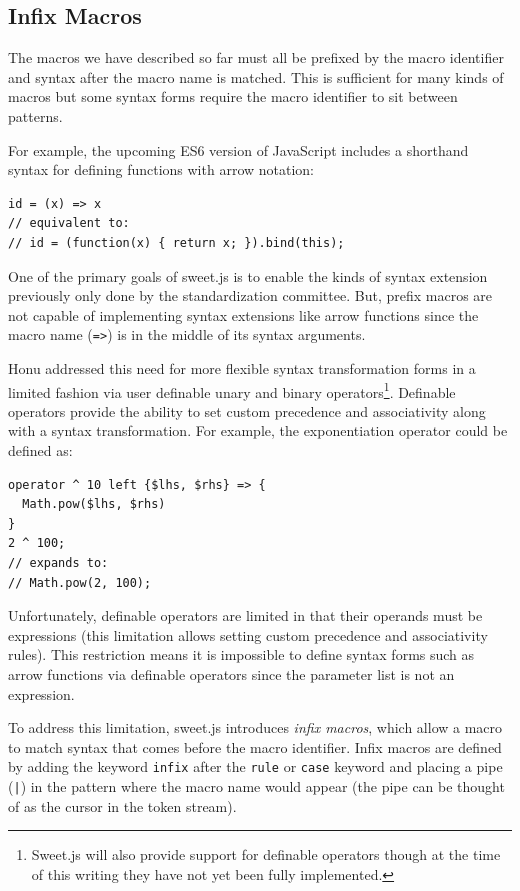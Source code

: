 \documentclass[preprint,10pt]{sigplanconf}
\begin{document}
\subsection{Infix Macros}
\label{sec:infix}
The macros we have described so far must all be prefixed by the macro
identifier and syntax after the macro name is matched. This is
sufficient for many kinds of macros but some syntax forms require the
macro identifier to sit between patterns.

For example, the upcoming ES6 version of JavaScript includes a
shorthand syntax for defining functions with arrow notation:

\begin{lstlisting}
id = (x) => x
// equivalent to:
// id = (function(x) { return x; }).bind(this);
\end{lstlisting}

One of the primary goals of sweet.js is to enable the kinds of syntax
extension previously only done by the standardization committee. But,
prefix macros are not capable of implementing syntax extensions like
arrow functions since the macro name (\verb!=>!) is in the middle
of its syntax arguments.

Honu addressed this need for more flexible syntax transformation forms
in a limited fashion via user definable unary and binary
operators\footnote{Sweet.js will also provide support for definable
  operators though at the time of this writing they have not yet been
  fully implemented.}. Definable operators provide the ability to set
custom precedence and associativity along with a syntax
transformation. For example, the exponentiation operator could be
defined as:
\begin{lstlisting}
operator ^ 10 left {$lhs, $rhs} => {
  Math.pow($lhs, $rhs)
}
2 ^ 100;
// expands to:
// Math.pow(2, 100);
\end{lstlisting}

Unfortunately, definable operators are limited in that their operands
must be expressions (this limitation allows setting custom precedence
and associativity rules). This restriction means it is impossible to
define syntax forms such as arrow functions via definable operators
since the parameter list is not an expression.

To address this limitation, sweet.js introduces \emph{infix macros},
which allow a macro to match syntax that comes before the macro
identifier. Infix macros are defined by adding the keyword
\verb!infix! after the \verb!rule! or \verb!case!
keyword and placing a pipe (\verb!|!) in the pattern where the
macro name would appear (the pipe can be thought of as the cursor in
the token stream).
\end{document}
